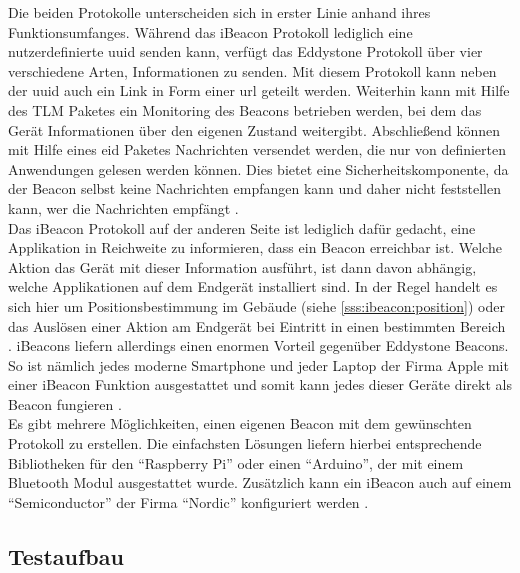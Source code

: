\noindent Die beiden Protokolle unterscheiden sich in erster Linie anhand ihres Funktionsumfanges. Während das iBeacon Protokoll lediglich eine nutzerdefinierte \ac{uuid} senden kann, verfügt das Eddystone Protokoll über vier verschiedene Arten, Informationen zu senden. Mit diesem Protokoll kann neben der \ac{uuid} auch ein Link in Form einer \ac{url} geteilt werden. Weiterhin kann mit Hilfe des TLM Paketes ein Monitoring des Beacons betrieben werden, bei dem das Gerät Informationen über den eigenen Zustand weitergibt. Abschließend können mit Hilfe eines \ac{eid} Paketes Nachrichten versendet werden, die nur von definierten Anwendungen gelesen werden können. Dies bietet eine Sicherheitskomponente, da der Beacon selbst keine Nachrichten empfangen kann und daher nicht feststellen kann, wer die Nachrichten empfängt \cite{EDD:WWW}.\\

\noindent Das iBeacon Protokoll auf der anderen Seite ist lediglich dafür gedacht, eine Applikation in Reichweite zu informieren, dass ein Beacon erreichbar ist. Welche Aktion das Gerät mit dieser Information ausführt, ist dann davon abhängig, welche Applikationen auf dem Endgerät installiert sind. In der Regel handelt es sich hier um Positionsbestimmung im Gebäude (siehe \ref{sss:ibeacon:position}) oder das Auslösen einer Aktion am Endgerät bei Eintritt in einen bestimmten Bereich \cite[Seite 32f]{Gast14:BPA}. iBeacons liefern allerdings einen enormen Vorteil gegenüber Eddystone Beacons. So ist nämlich jedes moderne Smartphone und jeder Laptop der Firma Apple mit einer iBeacon Funktion ausgestattet und somit kann jedes dieser Geräte direkt als Beacon fungieren \cite[Seite 21]{Gast14:BPA}.\\     

\noindent Es gibt mehrere Möglichkeiten, einen eigenen Beacon mit dem gewünschten Protokoll zu erstellen. Die einfachsten Lösungen liefern hierbei entsprechende Bibliotheken für den "`Raspberry Pi"' oder einen "`Arduino"', der mit einem Bluetooth Modul ausgestattet wurde. Zusätzlich kann ein iBeacon auch auf einem "`Semiconductor"' der Firma "`Nordic"' konfiguriert werden \cite[Seite 21]{Gast14:BPA}.

\subsection{Testaufbau}
\label{ss:ibeacon:kommunikation}


